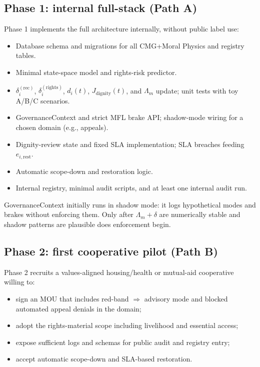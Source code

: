 \documentclass[11pt]{article}
\begin{document}
\subsection{Phase 1: internal full-stack (Path A)}

Phase 1 implements the full architecture internally, without public label use:

\begin{itemize}[leftmargin=*]
  \item Database schema and migrations for all CMG+Moral Physics and registry tables.
  \item Minimal state-space model and rights-risk predictor.
  \item \(\delta_i^{(\text{rec})}\), \(\delta_i^{(\text{rights})}\), \(d_i(t)\), \(J_{\text{dignity}}(t)\), and \(\Lambda_m\) update; unit tests with toy A/B/C scenarios.
  \item GovernanceContext and strict MFL brake API; shadow-mode wiring for a chosen domain (e.g., appeals).
  \item Dignity-review state and fixed SLA implementation; SLA breaches feeding \(e_{i,\text{rest}}\).
  \item Automatic scope-down and restoration logic.
  \item Internal registry, minimal audit scripts, and at least one internal audit run.
\end{itemize}

GovernanceContext initially runs in shadow mode: it logs hypothetical modes and brakes without enforcing them.
Only after \(\Lambda_m+\delta\) are numerically stable and shadow patterns are plausible does enforcement begin.

\subsection{Phase 2: first cooperative pilot (Path B)}

Phase 2 recruits a values-aligned housing/health or mutual-aid cooperative willing to:

\begin{itemize}[leftmargin=*]
  \item sign an MOU that includes red-band \(\Rightarrow\) advisory mode and blocked automated appeal denials in the domain;
  \item adopt the rights-material scope including livelihood and essential access;
  \item expose sufficient logs and schemas for public audit and registry entry;
  \item accept automatic scope-down and SLA-based restoration.
\end{itemize}
\end{document}
